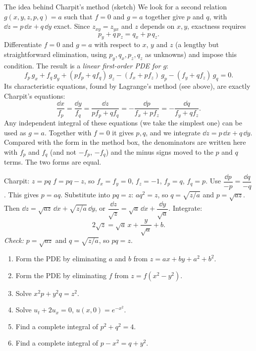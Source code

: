 \begin{derivbox}{The idea behind Charpit's method (sketch)}
We look for a second relation $g(x,y,z,p,q) = a$ such that $f = 0$ and $g = a$ together give $p$ and $q$, with $\dd z = p\,\dd x + q\,\dd y$ exact. Since $z_{xy} = z_{yx}$ and $z$ depends on $x,y$, exactness requires
\[ p_y + q\,p_z = q_x + p\,q_z . \]
Differentiate $f = 0$ and $g = a$ with respect to $x$, $y$ and $z$ (a lengthy but straightforward elimination, using $p_y,q_x,p_z,q_z$ as unknowns) and impose this condition. The result is a \emph{linear first-order PDE for $g$}:
\[ f_p\,g_x + f_q\,g_y + (pf_p + qf_q)\,g_z - (f_x + pf_z)\,g_p - (f_y + qf_z)\,g_q = 0. \]
Its characteristic equations, found by Lagrange's method (see above), are exactly Charpit's equations:
\[ \frac{\dd x}{f_p} = \frac{\dd y}{f_q} = \frac{\dd z}{pf_p + qf_q} = -\frac{\dd p}{f_x + pf_z} = -\frac{\dd q}{f_y + qf_z}. \]
Any independent integral of these equations (we take the simplest one) can be used as $g = a$. Together with $f=0$ it gives $p,q$, and we integrate $\dd z = p\,\dd x + q\,\dd y$. Compared with the form in the method box, the denominators are written here with $f_p$ and $f_q$ (and not $-f_p$, $-f_q$) and the minus signs moved to the $p$ and $q$ terms. The two forms are equal.
\end{derivbox}

\begin{examplebox}{Charpit: $z = pq$}
$f = pq - z$, so $f_x=f_y=0$, $f_z=-1$, $f_p=q$, $f_q=p$. Use $\dfrac{\dd p}{-p} = \dfrac{\dd q}{-q}$. This gives $p = aq$. Substitute into $pq=z$: $aq^2 = z$, so $q = \sqrt{z/a}$ and $p = \sqrt{az}$. Then $\dd z = \sqrt{az}\,\dd x + \sqrt{z/a}\,\dd y$, or $\dfrac{\dd z}{\sqrt z} = \sqrt a\,\dd x + \dfrac{\dd y}{\sqrt a}$. Integrate:
\[ 2\sqrt z = \sqrt a\,x + \frac{y}{\sqrt a} + b. \]
\textit{Check:} $p = \sqrt{az}$ and $q = \sqrt{z/a}$, so $pq = z$. \checkmark
\end{examplebox}

\begin{practicebox}
\begin{enumerate}
  \item Form the PDE by eliminating $a$ and $b$ from $z = ax + by + a^2 + b^2$.
  \item Form the PDE by eliminating $f$ from $z = f(x^2 - y^2)$.
  \item Solve $x^2p + y^2q = z^2$.
  \item Solve $u_t + 2u_x = 0$, $u(x,0) = e^{-x^2}$.
  \item Find a complete integral of $p^2+q^2 = 4$.
  \item Find a complete integral of $p - x^2 = q + y^2$.
\end{enumerate}
\end{practicebox}

